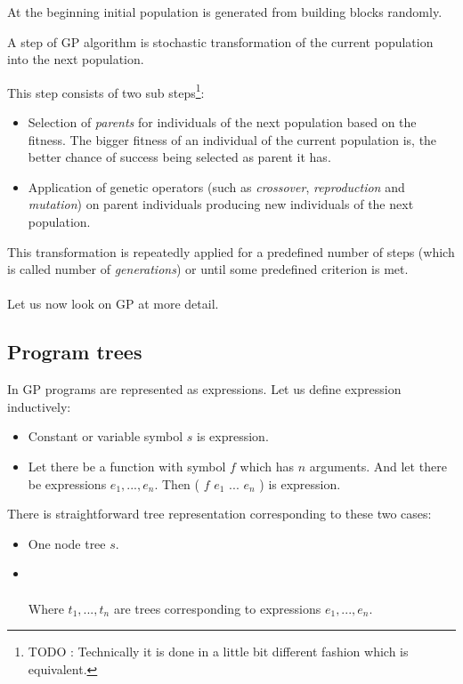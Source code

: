 \documentclass[12pt,a4paper]{report}
\newcommand{\Lets}{Let us }
\begin{document}
At the beginning initial population is generated from building blocks randomly.

A step of GP algorithm is stochastic transformation of the current population into 	
the next population.

This step consists of two sub steps\footnote{TODO : Technically it is done in a little  
bit different fashion which is equivalent.}:
\begin{itemize} 
	\item Selection of \textit{parents} for individuals of the next population based on the fitness.
	      The bigger fitness of an individual of the current population is, 
	      the better chance of success being selected as parent it has.  
	\item Application of genetic operators (such as \textit{crossover}, 
	      \textit{reproduction} and \textit{mutation}) 
		  on parent individuals producing new individuals of the next population.  
\end{itemize}	  
This transformation is repeatedly applied for a predefined number of steps (which is called 
number of \textit{generations}) or until some predefined criterion is met.	
\\\\
\Lets now look on GP at more detail. 


\subsection{Program trees}

In GP programs are represented as expressions. \Lets define expression inductively:

\begin{itemize}
	\item Constant or variable symbol $s$ is expression.
	\item Let there be a function with symbol $f$ which has $n$ arguments. 
	      And let there be expressions $e_{1}, ..., e_{n}$. 
	      Then ( $f$ $e_{1}$ ... $e_{n}$ ) is expression.   
\end{itemize}

There is straightforward tree representation corresponding to these two cases:

\begin{itemize}
	\item One node tree $s$.
    \item {}\\\\
		 Where $t_{1}, ..., t_{n}$ are trees corresponding to expressions $e_{1}, ..., e_{n}$.	   
\end{itemize}
\end{document}
